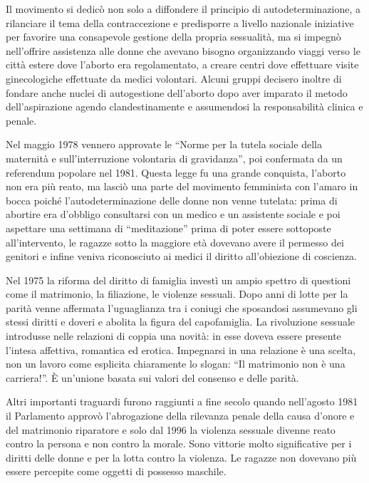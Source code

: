 Il movimento  si dedicò non solo a diffondere il principio di autodeterminazione, a rilanciare il tema della contraccezione e predisporre a livello nazionale iniziative per favorire una consapevole gestione della propria sessualità, ma si impegnò nell'offrire assistenza alle donne che avevano bisogno organizzando viaggi verso le città estere dove l'aborto era regolamentato, a creare centri dove effettuare visite ginecologiche effettuate da medici volontari.
Alcuni gruppi decisero inoltre di fondare anche nuclei di autogestione dell'aborto dopo aver imparato il metodo dell'aspirazione agendo clandestinamente e assumendosi la responsabilità clinica e penale.

Nel maggio 1978 vennero approvate le \enquote{Norme per la tutela sociale della maternità e sull'interruzione volontaria di gravidanza}, poi confermata da un referendum popolare nel 1981.
Questa legge fu una grande conquista, l'aborto non era più reato, ma lasciò una parte del movimento femminista con l'amaro in bocca poiché l'autodeterminazione delle donne non venne tutelata: prima di abortire era d'obbligo consultarsi con un medico e un assistente sociale e poi aspettare una settimana di \enquote{meditazione} prima di poter essere sottoposte all'intervento, le ragazze sotto la maggiore età dovevano avere il permesso dei genitori e infine veniva riconosciuto ai medici il diritto all'obiezione di coscienza.

Nel 1975 la riforma del diritto di famiglia investì un ampio spettro di questioni come il matrimonio, la filiazione, le violenze sessuali.
Dopo anni di lotte per la parità venne affermata l'uguaglianza tra i coniugi che sposandosi assumevano gli stessi diritti e doveri e abolita la figura del capofamiglia.
La rivoluzione sessuale introdusse nelle relazioni di coppia una novità: in esse doveva essere presente l'intesa affettiva, romantica ed erotica.
Impegnarsi in una relazione è una scelta, non un lavoro come esplicita chiaramente lo slogan: \enquote{Il matrimonio non è una carriera!}.
È un'unione basata sui valori del consenso e delle parità.

Altri importanti traguardi furono raggiunti a fine secolo quando nell'agosto 1981 il Parlamento approvò l'abrogazione della rilevanza penale della causa d'onore e del matrimonio riparatore e solo dal 1996 la violenza sessuale divenne reato contro la persona e non contro la morale.
Sono vittorie molto significative per i diritti delle donne e per la lotta contro la violenza.
Le ragazze non dovevano più essere percepite come oggetti di possesso maschile.

